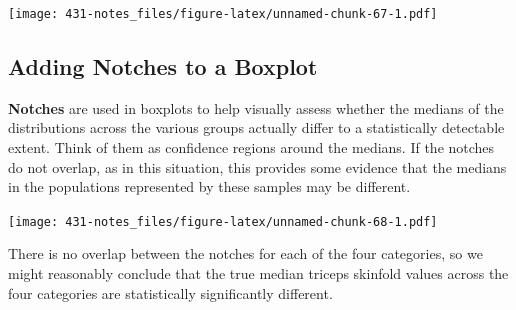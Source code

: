 \documentclass[
]{book}
\newenvironment{Shaded}{\begin{snugshade}}{\end{snugshade}}
\newcommand{\DataTypeTok}[1]{\textcolor[rgb]{0.13,0.29,0.53}{#1}}
\newcommand{\FloatTok}[1]{\textcolor[rgb]{0.00,0.00,0.81}{#1}}
\newcommand{\KeywordTok}[1]{\textcolor[rgb]{0.13,0.29,0.53}{\textbf{#1}}}
\newcommand{\NormalTok}[1]{#1}
\newcommand{\OperatorTok}[1]{\textcolor[rgb]{0.81,0.36,0.00}{\textbf{#1}}}
\newcommand{\OtherTok}[1]{\textcolor[rgb]{0.56,0.35,0.01}{#1}}
\newcommand{\StringTok}[1]{\textcolor[rgb]{0.31,0.60,0.02}{#1}}
\begin{document}
\texttt{[image: 431-notes\_files/figure-latex/unnamed-chunk-67-1.pdf]}

\hypertarget{adding-notches-to-a-boxplot}{%
\subsection{Adding Notches to a Boxplot}\label{adding-notches-to-a-boxplot}}

\textbf{Notches} are used in boxplots to help visually assess whether the medians of the distributions across the various groups actually differ to a statistically detectable extent. Think of them as confidence regions around the medians. If the notches do not overlap, as in this situation, this provides some evidence that the medians in the populations represented by these samples may be different.

\begin{Shaded}
\end{Shaded}

\texttt{[image: 431-notes\_files/figure-latex/unnamed-chunk-68-1.pdf]}

There is no overlap between the notches for each of the four categories, so we might reasonably conclude that the true median triceps skinfold values across the four categories are statistically significantly different.
\end{document}
